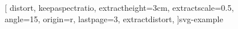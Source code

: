 \documentclass[ngerman,draft]{scrartcl}
\begin{document}
\makeatletter

\begin{figure}

[
  distort, 
  keepaspectratio,
  extractheight=3cm,
  extractscale=0.5,
  angle=15,
  origin=r,
  lastpage=3,
  extractdistort,
]{svg-example}%
%
%
\end{figure}

\end{document}
